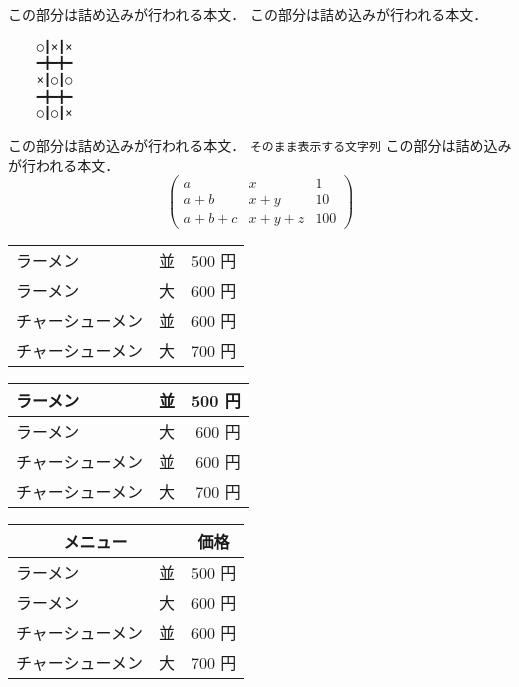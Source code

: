 \documentclass[11pt,a4paper]{jreport}
\begin{document}
この部分は詰め込みが行われる本文．
この部分は詰め込みが行われる本文．
\begin{verbatim}
    ○┃×┃×
    ━╋━╋━
    ×┃○┃○
    ━╋━╋━
    ○┃○┃×
\end{verbatim}
この部分は詰め込みが行われる本文．
\verb+そのまま表示する文字列+
この部分は詰め込みが行われる本文．
\[
\left(
\begin{array}{lcr}
a     & x     & 1    \\
a+b   & x+y   & 10   \\
a+b+c & x+y+z & 100
\end{array}
\right)
\]
\begin{tabular}{p{3cm}cr}
ラーメン & 並 & 500 円 \\
ラーメン & 大 & 600 円 \\
チャーシューメン & 並 & 600 円 \\
チャーシューメン & 大 & 700 円
\end{tabular}
\begin{tabular}{||p{3cm}|c|r||} \hline
ラーメン & 並 & 500 円 \\ \hline
ラーメン & 大 & 600 円 \\ \hline
チャーシューメン & 並 & 600 円 \\ \hline
チャーシューメン & 大 & 700 円  \\ \hline
\end{tabular}
\begin{tabular}{|p{3cm}|c||r|} \hline
\multicolumn{2}{|c||}{メニュー} & \multicolumn{1}{c|}{価格} \\ \hline
ラーメン & 並 & 500 円 \\ \hline
ラーメン & 大 & 600 円 \\ \hline
チャーシューメン & 並 & 600 円 \\ \hline
チャーシューメン & 大 & 700 円  \\ \hline
\end{tabular}
\end{document}
